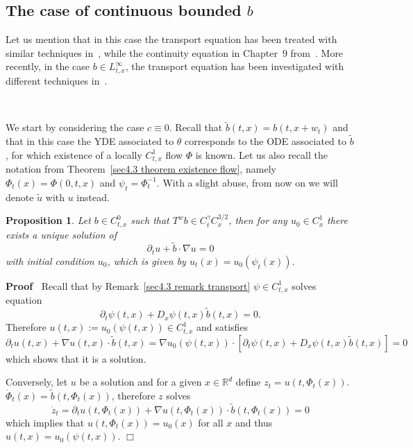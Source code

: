 \documentclass[10pt]{article}
\newcommand{\assign}{:=}
\newenvironment{proof}{\noindent\textbf{Proof\ }}{\hspace*{\fill}$\Box$\medskip}
\newtheorem{proposition}{Proposition}
{\theorembodyfont{\rmfamily}\newtheorem{remark}{Remark}}
\begin{document}
\subsection{The case of continuous bounded $b$}

Let us mention that in this case the transport equation has been treated with
similar techniques in~{\cite{catellier}}, while the continuity equation in
Chapter~9 from~{\cite{maurelli}}. More recently, in the case $b \in
L^{\infty}_{t, x}$, the transport equation has been investigated with
different techniques in~{\cite{amine2020}}.

\

We start by considering the case $c \equiv 0$. Recall that $\tilde{b} (t, x)
= b (t, x + w_t)$ and that in this case the YDE associated to $\theta$
corresponds to the ODE associated to $\tilde{b}$, for which existence of a
locally $C^1_{t, x}$ flow $\Phi$ is known. Let us also recall the notation
from Theorem~\ref{sec4.3 theorem existence flow}, namely $\Phi_t (x) = \Phi
(0, t, x)$ and $\psi_t = \Phi_t^{- 1}$. With a slight abuse, from now on we
will denote $\tilde{u}$ with $u$ instead.

\begin{proposition}
  \label{sec5.1 thm transport}Let $b \in C^0_{t, x}$ such that $T^w b \in
  C^{\gamma}_t C^{3 / 2}_x$, then for any $u_0 \in C^1_x$ there exists a
  unique solution of
  \begin{equation}
    \partial_t u + \tilde{b} \cdot \nabla u = 0 \label{sec5.1 transport eq}
  \end{equation}
  with initial condition $u_0$, which is given by $u_t (x) = u_0 (\psi_t
  (x))$.
\end{proposition}

\begin{proof}
  Recall that by Remark~\ref{sec4.3 remark transport} $\psi \in C^1_{t, x}$
  solves equation
  \[ \partial_t \psi (t, x) + D_x \psi (t, x)  \tilde{b} (t, x) = 0. \]
  Therefore $u (t, x) \assign u_0 (\psi (t, x)) \in C^1_{t, x}$ and satisfies
  \[ \partial_t u (t, x) + \nabla u (t, x) \cdot \tilde{b} (t, x) = \nabla u_0
     (\psi (t, x)) \cdot [\partial_t \psi (t, x) + D_x \psi (t, x) \tilde{b}
     (t, x)] = 0 \]
  which shows that it is a solution.
  
  Conversely, let $u$ be a solution and for a given $x \in \mathbb{R}^d$
  define $z_t = u (t, \Phi_t (x))$. $\dot{\Phi}_t (x) = \tilde{b} (t, \Phi_t
  (x))$, therefore $z$ solves
  \[ \dot{z}_t = \partial_t u (t, \Phi_t (x)) + \nabla u (t, \Phi_t (x)) \cdot
     \tilde{b} (t, \Phi_t (x)) = 0 \]
  which implies that $u (t, \Phi_t (x)) = u_0 (x)$ for all $x$ and thus $u (t,
  x) = u_0 (\psi (t, x))$.
\end{proof}
\end{document}
